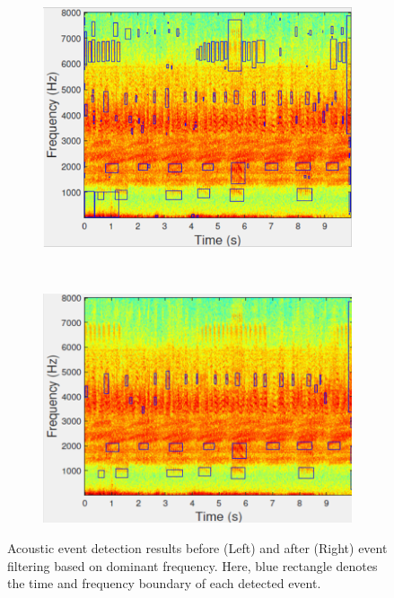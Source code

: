 \begin{figure}[htb!]
\centering

        \begin{subfigure}[b]{0.45\textwidth}
                \includegraphics[width=\textwidth, height =0.8 \textwidth]{image/Ch6/AEoriginal.png}
        \end{subfigure}
       ~
              \begin{subfigure}[b]{0.45\textwidth}
                \includegraphics[width=\textwidth,height = 0.8 \textwidth]{image/Ch6/AEfinal.png}                
        \end{subfigure}     
\caption[Acoustic event detection results]{Acoustic event detection results before (Left) and after (Right) event filtering based on dominant frequency. Here, blue rectangle denotes the time and frequency boundary of each detected event.}
        \label{fig:feature}
\end{figure}

